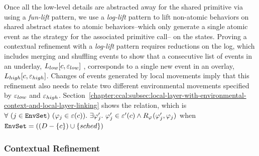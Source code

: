 Once all the low-level details are abstracted away for the shared primitive via using a \textit{fun-lift} pattern, we use a \textit{log-lift} pattern to lift non-atomic behaviors on shared abstract states to atomic behaviors--which only generate a single atomic event as the strategy for the associated primitive call-- on the states. 
Proving a contextual refinement with a \textit{log-lift} pattern requires reductions on the log, 
which includes merging and shuffling events to show 
that a consecutive list of  events in an underlay, $L_{low}[c, {\varepsilon}_{low}]$ , corresponds to a single new event in an overlay, 
$L_{high}[c, {\varepsilon}_{high}]$.  Changes of events generated by local movements
imply that this refinement also needs to relate two different environmental movements specified by ${\varepsilon}_{low}$ and ${\varepsilon}_{high}$.
Section~\ref{chapter:ccal:subsec:local-layer-with-environmental-context-and-local-layer-linking} shows the relation,
which is $\forall\ (j \in \codeinmath{EnvSet})\ 
(\strat{j} \in \oracle(c)) .\ \exists \stratp{j} . \ \stratp{j} \in \oracle'(c) \wedge R_{\strat{}}(\stratp{j}, \strat{j})$ when 
${\mathrm{\texttt{EnvSet}}} = ((D - \{ c\}) \cup \{ sched\})$


\subsubsection{Contextual Refinement}

